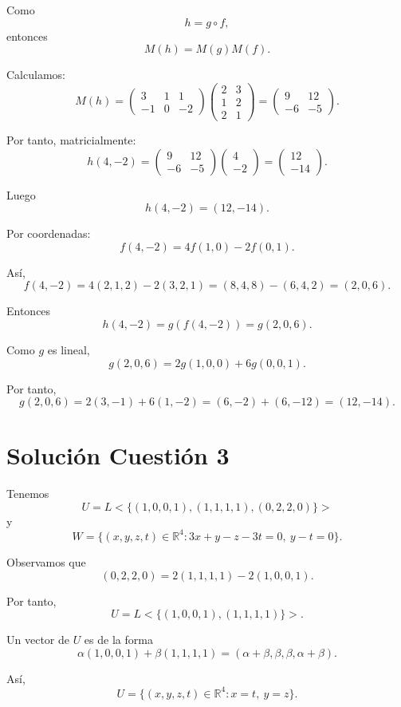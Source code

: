 \documentclass[12pt]{article}
\begin{document}
Como
\[
h=g\circ f,
\]
entonces
\[
M(h)=M(g)M(f).
\]

Calculamos:
\[
M(h)=
\begin{pmatrix}
3&1&1\\
-1&0&-2
\end{pmatrix}
\begin{pmatrix}
2&3\\
1&2\\
2&1
\end{pmatrix}
=
\begin{pmatrix}
9&12\\
-6&-5
\end{pmatrix}.
\]

Por tanto, matricialmente:
\[
h(4,-2)=
\begin{pmatrix}
9&12\\
-6&-5
\end{pmatrix}
\begin{pmatrix}
4\\
-2
\end{pmatrix}
=
\begin{pmatrix}
12\\
-14
\end{pmatrix}.
\]

Luego
\[
\boxed{h(4,-2)=(12,-14).}
\]

Por coordenadas:
\[
f(4,-2)=4f(1,0)-2f(0,1).
\]

Así,
\[
f(4,-2)=4(2,1,2)-2(3,2,1)=(8,4,8)-(6,4,2)=(2,0,6).
\]

Entonces
\[
h(4,-2)=g(f(4,-2))=g(2,0,6).
\]

Como \(g\) es lineal,
\[
g(2,0,6)=2g(1,0,0)+6g(0,0,1).
\]

Por tanto,
\[
g(2,0,6)=2(3,-1)+6(1,-2)=(6,-2)+(6,-12)=(12,-14).
\]

\section*{Solución Cuestión 3}

Tenemos
\[
U=L<\{(1,0,0,1),(1,1,1,1),(0,2,2,0)\}>
\]
y
\[
W=\{(x,y,z,t)\in\mathbb{R}^4:
3x+y-z-3t=0,\ y-t=0\}.
\]

Observamos que
\[
(0,2,2,0)=2(1,1,1,1)-2(1,0,0,1).
\]

Por tanto,
\[
U=L<\{(1,0,0,1),(1,1,1,1)\}>.
\]

Un vector de \(U\) es de la forma
\[
\alpha(1,0,0,1)+\beta(1,1,1,1)
=(\alpha+\beta,\beta,\beta,\alpha+\beta).
\]

Así,
\[
U=\{(x,y,z,t)\in\mathbb{R}^4:x=t,\ y=z\}.
\]
\end{document}
